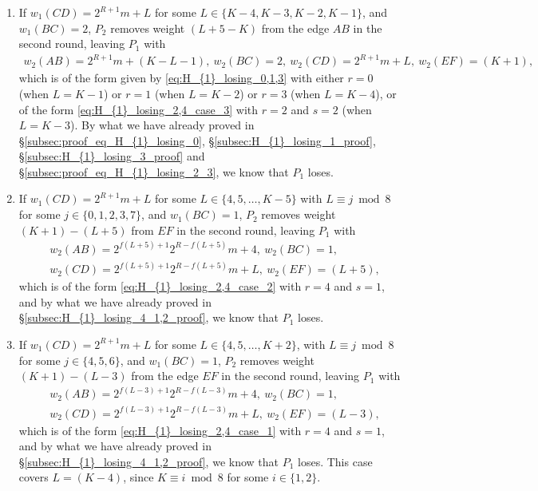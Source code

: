 \documentclass[11pt,reqno]{amsart}
\theoremstyle{definition}
\theoremstyle{definition}
\begin{document}
\begin{enumerate}
\begin{enumerate}
\item If $w_{1}(CD)=2^{R+1}m+L$ for some $L \in \{K-4,K-3,K-2,K-1\}$, and $w_{1}(BC)=2$, $P_{2}$ removes weight $(L+5-K)$ from the edge $AB$ in the second round, leaving $P_{1}$ with
\begin{align}
w_{2}(AB)=2^{R+1}m+(K-L-1),\ w_{2}(BC)=2,\ w_{2}(CD)=2^{R+1}m+L,\ w_{2}(EF)=(K+1),\nonumber
\end{align}
which is of the form given by \eqref{eq:H_{1}_losing_0,1,3} with either $r=0$ (when $L=K-1$) or $r=1$ (when $L=K-2$) or $r=3$ (when $L=K-4$), or of the form \eqref{eq:H_{1}_losing_2,4_case_3} with $r=2$ and $s=2$ (when $L=K-3$). By what we have already proved in \S\ref{subsec:proof_eq_H_{1}_losing_0}, \S\ref{subsec:H_{1}_losing_1_proof}, \S\ref{subsec:H_{1}_losing_3_proof} and \S\ref{subsec:proof_eq_H_{1}_losing_2_3}, we know that $P_{1}$ loses. 

\item If $w_{1}(CD)=2^{R+1}m+L$ for some $L \in \{4,5,\ldots,K-5\}$ with $L \equiv j \bmod 8$ for some $j \in \{0,1,2,3,7\}$, and $w_{1}(BC)=1$, $P_{2}$ removes weight $(K+1)-(L+5)$ from $EF$ in the second round, leaving $P_{1}$ with
\begin{align}
{}&w_{2}(AB)=2^{f(L+5)+1}2^{R-f(L+5)}m+4,\ w_{2}(BC)=1,\nonumber\\
{}&w_{2}(CD)=2^{f(L+5)+1}2^{R-f(L+5)}m+L,\ w_{2}(EF)=(L+5),\nonumber
\end{align}
which is of the form \eqref{eq:H_{1}_losing_2,4_case_2} with $r=4$ and $s=1$, and by what we have already proved in \S\ref{subsec:H_{1}_losing_4_1,2_proof}, we know that $P_{1}$ loses.

\item If $w_{1}(CD)=2^{R+1}m+L$ for some $L \in \{4,5,\ldots,K+2\}$, with $L \equiv j \bmod 8$ for some $j \in \{4,5,6\}$, and $w_{1}(BC)=1$, $P_{2}$ removes weight $(K+1)-(L-3)$ from the edge $EF$ in the second round, leaving $P_{1}$ with
\begin{align}
{}&w_{2}(AB)=2^{f(L-3)+1}2^{R-f(L-3)}m+4,\ w_{2}(BC)=1,\nonumber\\
{}&w_{2}(CD)=2^{f(L-3)+1}2^{R-f(L-3)}m+L,\ w_{2}(EF)=(L-3),\nonumber
\end{align}
which is of the form \eqref{eq:H_{1}_losing_2,4_case_1} with $r=4$ and $s=1$, and by what we have already proved in \S\ref{subsec:H_{1}_losing_4_1,2_proof}, we know that $P_{1}$ loses. This case covers $L=(K-4)$, since $K \equiv i \bmod 8$ for some $i \in \{1,2\}$.


\end{enumerate}
\end{enumerate}
\end{document}
